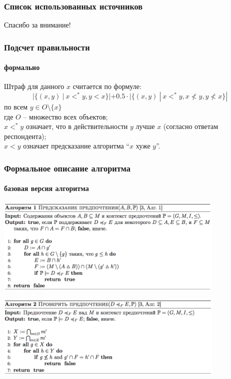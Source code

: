 \documentclass[xcolor=table]{beamer}
\theoremstyle{definition}
\begin{document}
	\begin{frame}[allowframebreaks]
		\frametitle{Список использованных источников}
		
		
	\end{frame}
	
	\begin{frame}[plain,c]
		\begin{center}
			\Huge Спасибо за внимание!
		\end{center}
	\end{frame}
		
	\appendix
	
	\begin{frame}
		\frametitle{Подсчет правильности}
		\framesubtitle{формально}
		
		Штраф для данного $x$ считается по формуле:
		$$|\{(x,y)\:|\: x <^* y, y < x\}| + 0.5\cdot|\{(x,y)\: |\: x <^* y, x \nless y, y \nless x \}|$$
		по всем $y \in O \setminus \{x\}$ \\
		где $O$ – множество всех объектов; \\
		$x <^* y$ означает, что в действительности $y$ лучше $x$ (согласно ответам респондента); \\
		$x < y$ означает предсказание  алгоритма ``$x$ хуже $y$''.
	\end{frame}
	
	\begin{frame}[allowframebreaks]
		\frametitle{Формальное описание алгоритма}
		\framesubtitle{базовая версия алгоритма}
		\begin{center}
			\includegraphics[width=110mm]{./images/algo1.png}
		\end{center}
		\begin{center}
			\includegraphics[width=110mm]{./images/algo2.png}
		\end{center}
	\end{frame}
	
\end{document}
